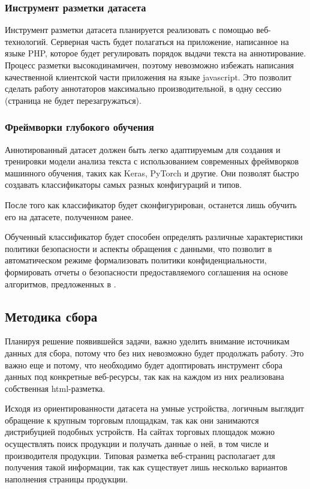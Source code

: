 \documentclass[../main]{subfiles}
\begin{document}
\subsubsection{Инструмент разметки датасета}
Инструмент разметки датасета планируется реализовать с помощью веб-технологий. Серверная часть будет полагаться на приложение, написанное на языке PHP, которое будет регулировать порядок выдачи текста на аннотирование. Процесс разметки высокодинамичен, поэтому невозможно избежать написания качественной клиентской части приложения на языке javascript. Это позволит сделать работу аннотаторов максимально производительной, в одну сессию (страница не будет перезагружаться).

\subsubsection{Фреймворки глубокого обучения}
Аннотированный датасет должен быть легко адаптируемым для создания и тренировки модели анализа текста с использованием современных фреймворков машинного обучения, таких как Keras, PyTorch и другие. Они позволят быстро создавать классификаторы самых разных конфигураций и типов.

После того как классификатор будет сконфигурирован, останется лишь обучить его на датасете, полученном ранее.

Обученный классификатор будет способен определять различные характеристики политики безопасности и аспекты обращения с данными, что позволит в автоматическом режиме формализовать политики конфиденциальности, формировать отчеты о безопасности предоставляемого соглашения на основе алгоритмов, предложенных в \cite{P2Onto}.

\subsection{Методика сбора}
Планируя решение появившейся задачи, важно уделить внимание источникам данных для сбора, потому что без них невозможно будет продолжать работу. Это важно еще и потому, что необходимо будет адоптировать инструмент сбора данных под конкретные веб-ресурсы, так как на каждом из них реализована собственная html-разметка.

Исходя из ориентированности датасета на умные устройства, логичным выглядит обращение к крупным торговым площадкам, так как они занимаются дистрибуцией подобных устройств. На сайтах торговых площадок можно осуществлять поиск продукции и получать данные о ней, в том числе и производителя продукции. Типовая разметка веб-страниц располагает для получения такой информации, так как существует лишь несколько вариантов наполнения страницы продукции.
\end{document}
